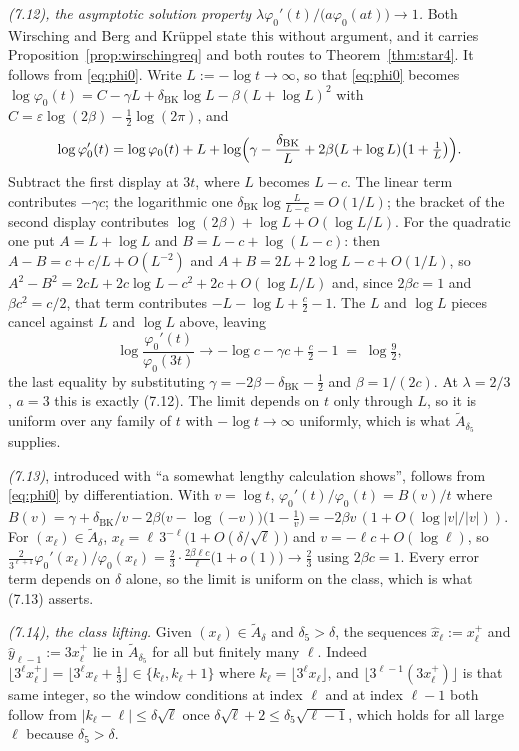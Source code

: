\documentclass[11pt]{article}
\theoremstyle{definition}
\theoremstyle{remark}
\begin{document}
\emph{(7.12), the asymptotic solution property
$\lambda\varphi_0'(t)/\bigl(a\varphi_0(at)\bigr)\to1$.} Both Wirsching
and Berg and Kr\"uppel state this without argument, and it carries
Proposition~\ref{prop:wirschingreq} and both routes to
Theorem~\ref{thm:star4}. It follows from \eqref{eq:phi0}. Write
$L:=-\log t\to\infty$, so that \eqref{eq:phi0} becomes
$\log\varphi_0(t)=C-\gamma L+\delta_{\mathrm{BK}}\log L-\beta(L+\log L)^2$
with $C=\varepsilon\log(2\beta)-\tfrac12\log(2\pi)$, and
\[
 \log\varphi_0'(t)=\log\varphi_0(t)+L+\log\Bigl(\gamma
 -\frac{\delta_{\mathrm{BK}}}{L}+2\beta(L+\log L)\bigl(1+\tfrac1L\bigr)\Bigr).
\]
Subtract the first display at $3t$, where $L$ becomes $L-c$. The linear
term contributes $-\gamma c$; the logarithmic one
$\delta_{\mathrm{BK}}\log\frac{L}{L-c}=O(1/L)$; the bracket of the
second display contributes $\log(2\beta)+\log L+O(\log L/L)$. For the
quadratic one put $A=L+\log L$ and $B=L-c+\log(L-c)$: then
$A-B=c+c/L+O(L^{-2})$ and $A+B=2L+2\log L-c+O(1/L)$, so
$A^2-B^2=2cL+2c\log L-c^2+2c+O(\log L/L)$ and, since $2\beta c=1$ and
$\beta c^2=c/2$, that term contributes $-L-\log L+\tfrac c2-1$. The $L$
and $\log L$ pieces cancel against $L$ and $\log L$ above, leaving
\begin{equation}\label{eq:w712}
 \log\frac{\varphi_0'(t)}{\varphi_0(3t)}
 \longrightarrow -\log c-\gamma c+\tfrac c2-1
 \;=\;\log\tfrac92 ,
\end{equation}
the last equality by substituting $\gamma=-2\beta-\delta_{\mathrm{BK}}
-\tfrac12$ and $\beta=1/(2c)$. At $\lambda=2/3$, $a=3$ this is exactly
(7.12). The
limit depends on $t$ only through $L$, so it is uniform over any family
of $t$ with $-\log t\to\infty$ uniformly, which is what
$\widetilde A_{\delta_5}$ supplies.

\emph{(7.13)}, introduced with ``a somewhat lengthy calculation shows'',
follows from \eqref{eq:phi0} by differentiation. With $v=\log t$,
$\varphi_0'(t)/\varphi_0(t)=B(v)/t$ where
$B(v)=\gamma+\delta_{\mathrm{BK}}/v-2\beta\bigl(v-\log(-v)\bigr)
\bigl(1-\tfrac1v\bigr)=-2\beta v\,(1+O(\log|v|/|v|))$. For
$(x_\ell)\in\widetilde A_\delta$, $x_\ell=\ell\,3^{-\ell}
\bigl(1+O(\delta/\sqrt\ell)\bigr)$ and $v=-\ell c+O(\log\ell)$, so
$\tfrac2{3^{\ell+1}}\varphi_0'(x_\ell)/\varphi_0(x_\ell)
=\tfrac23\cdot\tfrac{2\beta\ell c}{\ell}\bigl(1+o(1)\bigr)\to\tfrac23$
using $2\beta c=1$. Every error term depends on $\delta$ alone, so the
limit is uniform on the class, which is what (7.13) asserts.

\emph{(7.14), the class lifting.} Given $(x_\ell)\in\widetilde A_\delta$
and $\delta_5>\delta$, the sequences $\hat x_\ell:=x_\ell^+$ and
$\hat y_{\ell-1}:=3x_\ell^+$ lie in $\widetilde A_{\delta_5}$ for all but
finitely many $\ell$. Indeed $\lfloor3^\ell x_\ell^+\rfloor
=\lfloor3^\ell x_\ell+\tfrac13\rfloor\in\{k_\ell,k_\ell+1\}$ where
$k_\ell=\lfloor3^\ell x_\ell\rfloor$, and
$\lfloor3^{\ell-1}(3x_\ell^+)\rfloor$ is that same integer, so the window
conditions at index $\ell$ and at index $\ell-1$ both follow from
$|k_\ell-\ell|\le\delta\sqrt\ell$ once
$\delta\sqrt\ell+2\le\delta_5\sqrt{\ell-1}$, which holds for all large
$\ell$ because $\delta_5>\delta$.
\end{document}
